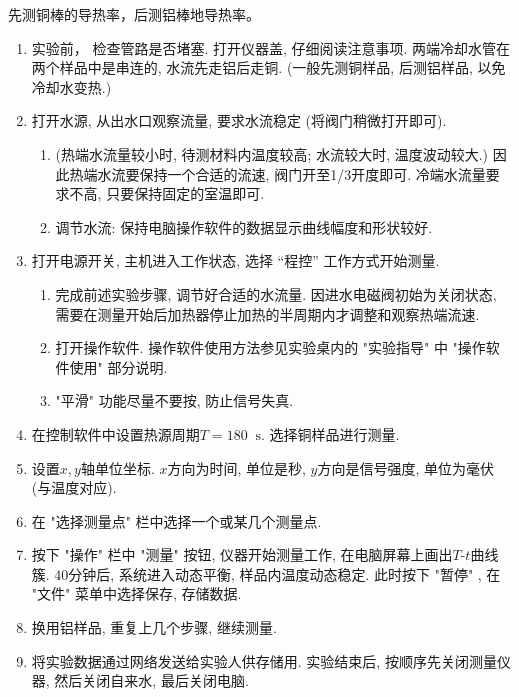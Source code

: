 \documentclass[11pt]{article}
\newcommand*{\unit}[1]{\mathop{}\!\mathrm{#1}}
\begin{document}
先测铜棒的导热率，后测铝棒地导热率。

\begin{enumerate}

  \item 实验前， 检查管路是否堵塞. 打开仪器盖, 仔细阅读注意事项. 两端冷却水管在两个样品中是串连的, 水流先走铝后走铜. (一般先测铜样品, 后测铝样品, 以免冷却水变热.)
  
  \item 打开水源, 从出水口观察流量, 要求水流稳定 (将阀门稍微打开即可).
  
  \begin{enumerate}

      \item (热端水流量较小时, 待测材料内温度较高; 水流较大时, 温度波动较大.) 因此热端水流要保持一个合适的流速, 阀门开至1/3开度即可. 冷端水流量要求不高, 只要保持固定的室温即可. 

      \item 调节水流: 保持电脑操作软件的数据显示曲线幅度和形状较好.

  \end{enumerate}

  \item 打开电源开关, 主机进入工作状态, 选择 “程控” 工作方式开始测量.

  \begin{enumerate}

      \item 完成前述实验步骤, 调节好合适的水流量. 因进水电磁阀初始为关闭状态, 需要在测量开始后加热器停止加热的半周期内才调整和观察热端流速. 

      \item 打开操作软件. 操作软件使用方法参见实验桌内的 "实验指导" 中 "操作软件使用" 部分说明.
      
      \item "平滑" 功能尽量不要按, 防止信号失真. 
  \end{enumerate}

  \item 在控制软件中设置热源周期$T = 180\unit{s}$. 选择铜样品进行测量. 

  \item 设置$x,y$轴单位坐标. $x$方向为时间, 单位是秒, $y$方向是信号强度, 单位为毫伏 (与温度对应). 

  \item 在 "选择测量点" 栏中选择一个或某几个测量点. 

  \item 按下 "操作" 栏中 "测量" 按钮, 仪器开始测量工作, 在电脑屏幕上画出$T$-$t$曲线簇. $40$分钟后, 系统进入动态平衡, 样品内温度动态稳定. 此时按下 "暂停" , 在 "文件" 菜单中选择保存, 存储数据.

  \item 换用铝样品, 重复上几个步骤, 继续测量.

  \item 将实验数据通过网络发送给实验人供存储用. 实验结束后, 按顺序先关闭测量仪器, 然后关闭自来水, 最后关闭电脑. 

\end{enumerate}
\end{document}
